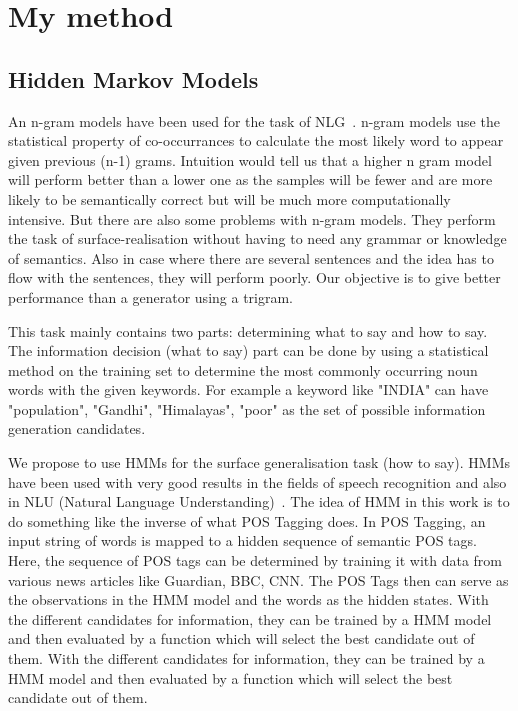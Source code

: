 \documentclass[a4paper,12pt]{article}
\begin{document}
\section{My method}
\label{sec:method}

\subsection{Hidden Markov Models}

An n-gram models have been used for the task of NLG~\cite{nlgngram}. n-gram models use the
statistical property of co-occurrances to calculate the most likely word to
appear given previous (n-1) grams. Intuition would tell us that a higher n gram
model will perform better than a lower one as the samples will be fewer and are
more likely to be semantically correct but will be much more computationally
intensive. But there are  also some problems with n-gram models. They perform
the task of surface-realisation without having to need any grammar or knowledge
of semantics. Also in case where there are several sentences and the idea has to
flow with the sentences, they will perform poorly. Our objective is to give
better performance than a generator using a trigram.

This task mainly contains two parts: determining what to say and how to say.
The information decision (what to say) part can be done by using a statistical
method on the training set to determine the most commonly occurring noun words
with the given keywords. For example a keyword like "INDIA" can have
"population", "Gandhi", "Himalayas", "poor" as the set of possible information
generation candidates.

We propose to use HMMs for the surface generalisation task (how to say). HMMs
have been used with very good results in the fields of speech recognition and
also in NLU (Natural Language Understanding)~\cite{hmmsr}. The idea of HMM in this work is to
do something like the inverse of what POS Tagging does. In POS Tagging, an input
string of words is mapped to a hidden sequence of semantic POS tags. Here, the
sequence of POS tags can be determined by training it with data from various
news articles like Guardian, BBC, CNN. The POS Tags then can serve as the
observations in the HMM model and the words as the hidden states.  With the
different candidates for information, they can be trained by a HMM model and
then evaluated by a function which will select the best candidate out of them.
With the different candidates for information, they can be trained by a HMM
model and then evaluated by a function which will select the best candidate
out of them.
\end{document}
